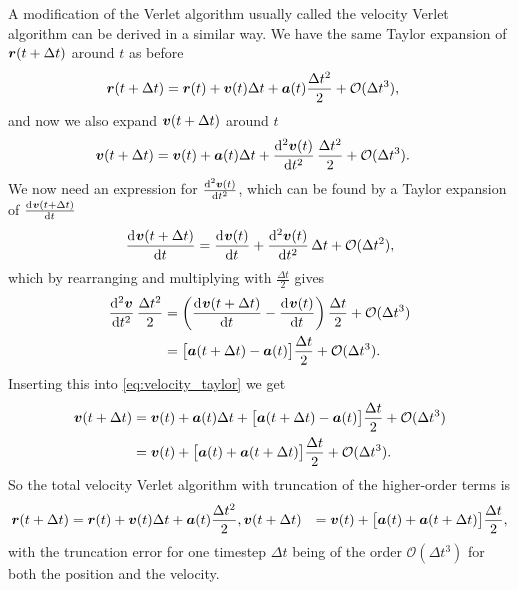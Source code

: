 A modification of the Verlet algorithm usually called the velocity Verlet algorithm\cite{swope1982computer}  can be derived in a similar way. We have the same Taylor expansion of $\boldsymbol{r}(t+\Delta t)$ around $t$ as before
\begin{align}
    \rvec(t + \Delta t) &= \rvec(t) + \vvec(t)\Delta t + \avec(t)\frac{\Delta t^2}{2} + \mathcal{O}(\Delta t^3), %
\end{align}
and now we also expand $\boldsymbol{v}(t + \Delta t)$ around $t$
\begin{align}
    \vvec(t + \Delta t) 
    &= \vvec(t) + \avec(t)\Delta t + \dod[2]{\vvec(t)}{t}\frac{\Delta t^2}{2} + \mathcal{O}(\Delta t^3). \label{eq:velocity_taylor}
\end{align}
We now need an expression for $\od[2]{\vvec(t)}{t}$, which can be found by a Taylor expansion of $\od{\vvec(t+\Delta t)}{t}$
\begin{align*}
    \dod{\vvec(t+\Delta t)}{t} = \dod{\vvec(t)}{t} + \dod[2]{\vvec(t)}{t}\Delta t + \mathcal{O}(\Delta t^2),
\end{align*}
which by rearranging and multiplying with $\frac{\Delta t}{2}$ gives
\begin{align*}
    \dod[2]{\vvec}{t}\frac{\Delta t^2}{2} 
    &= \left( \dod{\vvec(t+\Delta t)}{t} - \dod{\vvec(t)}{t}\right)\frac{\Delta t}{2} + \mathcal{O}(\Delta t^3) \\
    &= \big[\avec(t + \Delta t) - \avec(t)\big] \frac{\Delta t}{2} + \mathcal{O}(\Delta t^3).
\end{align*}
Inserting this into \cref{eq:velocity_taylor} we get
\begin{align}
    \vvec(t + \Delta t) 
    &= \vvec(t) + \avec(t)\Delta t + \big[\avec(t + \Delta t) - \avec(t)\big] \frac{\Delta t}{2} + \mathcal{O}(\Delta t^3) \nonumber\\
    &= \vvec(t) + \big[\avec(t) + \avec(t + \Delta t)\big] \frac{\Delta t}{2} + \mathcal{O}(\Delta t^3). %
\end{align}
So the total velocity Verlet algorithm with truncation of the higher-order terms is
\begin{align}
    \rvec(t + \Delta t) &= \rvec(t) + \vvec(t)\Delta t + \avec(t)\frac{\Delta t^2}{2}, %
    \vvec(t + \Delta t) &= \vvec(t) + \big[\avec(t) + \avec(t + \Delta t)\big] \frac{\Delta t}{2}, %
\end{align}
with the truncation error for one timestep $\Delta t$ being of the order $\mathcal{O}(\Delta t^3)$ for both the position and the velocity. 


